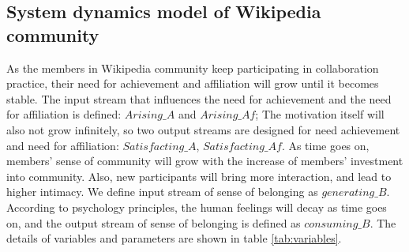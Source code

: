 \documentclass[doublespacing]{elsarticle}
\begin{document}
\subsection{System dynamics model of Wikipedia community}
\label{sec:wikipedia}
As the members in Wikipedia community  keep participating in collaboration practice, 
 their need for achievement and affiliation will grow until
it becomes stable. The input stream that influences the need for
achievement and the need for affiliation is defined: $Arising\_A$ and $Arising\_Af$; The motivation itself will also not grow infinitely, so
two output streams are designed for need achievement and need for
affiliation: $Satisfacting\_A$, $Satisfacting\_Af$. As time goes on,
members' sense of community will grow with the increase of members' investment
into community. Also, new participants will bring more interaction, and lead to higher
intimacy. We define input stream of sense of belonging as
$generating\_B$. According to psychology principles, the human feelings
will decay as time goes on, and the output stream of sense of
belonging is defined as $consuming\_B$. The details of variables and
parameters are shown in table \ref{tab:variables}. 
\end{document}
